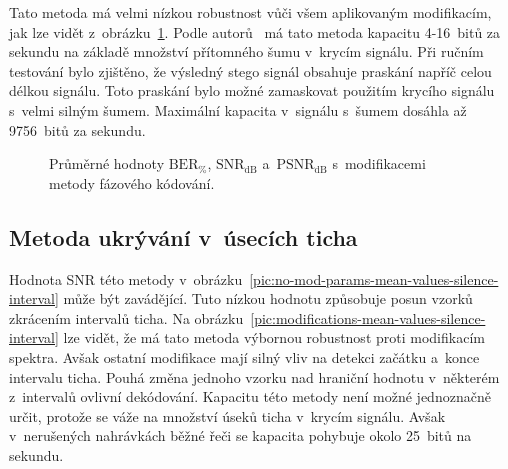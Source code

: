 Tato metoda má velmi nízkou robustnost vůči všem aplikovaným modifikacím, jak
lze vidět z~obrázku~\ref{pic:modifications-mean-values-phase}. Podle
autorů~\cite{Bender1996} má tato metoda kapacitu 4-16~bitů za sekundu na
základě množství přítomného šumu v~krycím signálu. Při ručním testování bylo
zjištěno, že výsledný stego signál obsahuje praskání napříč celou délkou
signálu. Toto praskání bylo možné zamaskovat použitím krycího signálu s~velmi
silným šumem. Maximální kapacita v~signálu s~šumem dosáhla až 9756~bitů za
sekundu.

\begin{figure}[H]
    \table
    \centering
    \caption{Průměrné hodnoty $\mathrm{BER}_{\%}$, $\mathrm{SNR}_\mathrm{dB}$
    a~$\mathrm{PSNR}_\mathrm{dB}$ s~modifikacemi metody fázového kódování.}
    \label{pic:modifications-mean-values-phase}
\end{figure}

\subsection*{Metoda ukrývání v~úsecích ticha}

Hodnota SNR této metody
v~obrázku~\ref{pic:no-mod-params-mean-values-silence-interval} může být
zavádějící. Tuto nízkou hodnotu způsobuje posun vzorků zkrácením intervalů
ticha. Na obrázku~\ref{pic:modifications-mean-values-silence-interval} lze
vidět, že má tato metoda výbornou robustnost proti modifikacím spektra. Avšak
ostatní modifikace mají silný vliv na detekci začátku a~konce intervalu ticha.
Pouhá změna jednoho vzorku nad hraniční hodnotu v~některém z~intervalů ovlivní
dekódování. Kapacitu této metody není možné jednoznačně určit, protože se váže
na množství úseků ticha v~krycím signálu. Avšak v~nerušených nahrávkách běžné
řeči se kapacita pohybuje okolo 25~bitů na sekundu.

